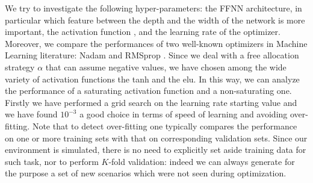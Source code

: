 \documentclass[runningheads]{m2ef}
\newcommand{\change}[1]{{\color{red} {#1}}}%
\begin{document}
We try to investigate the following hyper-parameters: the FFNN architecture, in particular which feature between the depth and the width of the network is more important, the activation function\change{,} and the learning rate of the optimizer. Moreover, we compare the performances of two well-known optimizers in Machine Learning literature: Nadam \cite{Dozat2016} and RMSprop \cite{Hiton2012}. Since we deal with a free allocation strategy $\alpha$ that can assume negative values, we have chosen among the wide variety of activation functions \change{\cite{Goodfellow2016}} the tanh and the elu. In this way, we can analyze the performance of a saturating activation function and a non-saturating one. Firstly we have performed a grid search on the learning rate starting value and we have found $10^{-3}$ a good choice in terms of speed of learning and avoiding over-fitting. \change{Note that to detect over-fitting one typically compares the performance on one or more training sets with that on corresponding validation sets. Since our environment is simulated, there is no need to explicitly set aside training data for such task, nor to perform $K$-fold validation: indeed we can always generate for the purpose a set of new scenarios which were not seen during optimization.}
\end{document}
